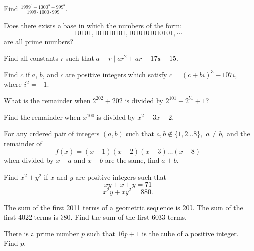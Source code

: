 \documentclass{article}
\begin{document}
\begin{prob}[]{2}
Find $\frac{1999^3-1000^3-999^3}{1999\cdot 1000\cdot 999}.$
\end{prob}

\begin{prob}[PAMO 2003/3]{2}
Does there exists a base in which the numbers of the form:
\[ 10101, 101010101, 1010101010101,\cdots \]
are all prime numbers?
\end{prob}

\begin{prob}[]{2}
Find all constants $r$ such that $a-r\mid ar^2+ar-17a+15.$
\end{prob}

\begin{prob}[AIME 1985/3]{2}
Find $c$ if $a$, $b$, and $c$ are positive integers which satisfy $c=(a + bi)^3 - 107i$, where $i^2 = -1$.
\end{prob}
    
\begin{req}[AMC 10B 2020/22]{2}
What is the remainder when $2^{202}+202$ is divided by $2^{101}+2^{51}+1$?
\end{req}

\begin{prob}[AHSME 1969/34]{2}
Find the remainder when $x^{100}$ is divided by $x^2-3x+2.$
\end{prob}

\begin{prob}{3}
For any ordered pair of integers $(a,b)$ such that $a,b\not\in \{1,2\dots 8\},$ $a\neq b,$ and the remainder of $$f(x)=(x-1)(x-2)(x-3)\dots(x-8)$$ when divided by $x-a$ and $x-b$ are the same, find $a+b.$
\end{prob}

\begin{prob}[AIME 1991/1]{3}
Find $x^2+y^2$ if $x$ and $y$ are positive integers such that
\[xy+x+y = 71\]
\[x^2y+xy^2 = 880.\]
\end{prob}

\begin{prob}[AIME II 2011/5]{3}
The sum of the first 2011 terms of a geometric sequence is 200. The sum of the first 4022 terms is 380. Find the sum of the first 6033 terms.
\end{prob}

\begin{prob}[AIME I 2015/3]{4}
There is a prime number $p$ such that $16p + 1$ is the cube of a positive integer. Find $p.$
\end{prob}
\end{document}
